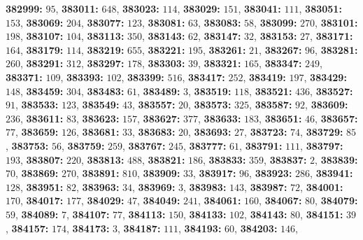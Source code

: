 \textsf{\bfseries 382999:} $95$, \textsf{\bfseries 383011:} $648$, \textsf{\bfseries 383023:} $114$, \textsf{\bfseries 383029:} $151$, \textsf{\bfseries 383041:} $111$, \textsf{\bfseries 383051:} $153$, \textsf{\bfseries 383069:} $204$, \textsf{\bfseries 383077:} $123$, \textsf{\bfseries 383081:} $63$, \textsf{\bfseries 383083:} $58$, \textsf{\bfseries 383099:} $270$, \textsf{\bfseries 383101:} $198$, \textsf{\bfseries 383107:} $104$, \textsf{\bfseries 383113:} $350$, \textsf{\bfseries 383143:} $62$, \textsf{\bfseries 383147:} $32$, \textsf{\bfseries 383153:} $27$, \textsf{\bfseries 383171:} $164$, \textsf{\bfseries 383179:} $114$, \textsf{\bfseries 383219:} $655$, \textsf{\bfseries 383221:} $195$, \textsf{\bfseries 383261:} $21$, \textsf{\bfseries 383267:} $96$, \textsf{\bfseries 383281:} $260$, \textsf{\bfseries 383291:} $312$, \textsf{\bfseries 383297:} $178$, \textsf{\bfseries 383303:} $39$, \textsf{\bfseries 383321:} $165$, \textsf{\bfseries 383347:} $249$, \textsf{\bfseries 383371:} $109$, \textsf{\bfseries 383393:} $102$, \textsf{\bfseries 383399:} $516$, \textsf{\bfseries 383417:} $252$, \textsf{\bfseries 383419:} $197$, \textsf{\bfseries 383429:} $148$, \textsf{\bfseries 383459:} $304$, \textsf{\bfseries 383483:} $61$, \textsf{\bfseries 383489:} $3$, \textsf{\bfseries 383519:} $118$, \textsf{\bfseries 383521:} $436$, \textsf{\bfseries 383527:} $91$, \textsf{\bfseries 383533:} $123$, \textsf{\bfseries 383549:} $43$, \textsf{\bfseries 383557:} $20$, \textsf{\bfseries 383573:} $325$, \textsf{\bfseries 383587:} $92$, \textsf{\bfseries 383609:} $236$, \textsf{\bfseries 383611:} $83$, \textsf{\bfseries 383623:} $157$, \textsf{\bfseries 383627:} $377$, \textsf{\bfseries 383633:} $183$, \textsf{\bfseries 383651:} $46$, \textsf{\bfseries 383657:} $77$, \textsf{\bfseries 383659:} $126$, \textsf{\bfseries 383681:} $33$, \textsf{\bfseries 383683:} $20$, \textsf{\bfseries 383693:} $27$, \textsf{\bfseries 383723:} $74$, \textsf{\bfseries 383729:} $85$, \textsf{\bfseries 383753:} $56$, \textsf{\bfseries 383759:} $259$, \textsf{\bfseries 383767:} $245$, \textsf{\bfseries 383777:} $61$, \textsf{\bfseries 383791:} $111$, \textsf{\bfseries 383797:} $193$, \textsf{\bfseries 383807:} $220$, \textsf{\bfseries 383813:} $488$, \textsf{\bfseries 383821:} $186$, \textsf{\bfseries 383833:} $359$, \textsf{\bfseries 383837:} $2$, \textsf{\bfseries 383839:} $70$, \textsf{\bfseries 383869:} $270$, \textsf{\bfseries 383891:} $810$, \textsf{\bfseries 383909:} $33$, \textsf{\bfseries 383917:} $96$, \textsf{\bfseries 383923:} $286$, \textsf{\bfseries 383941:} $128$, \textsf{\bfseries 383951:} $82$, \textsf{\bfseries 383963:} $34$, \textsf{\bfseries 383969:} $3$, \textsf{\bfseries 383983:} $143$, \textsf{\bfseries 383987:} $72$, \textsf{\bfseries 384001:} $170$, \textsf{\bfseries 384017:} $177$, \textsf{\bfseries 384029:} $47$, \textsf{\bfseries 384049:} $241$, \textsf{\bfseries 384061:} $160$, \textsf{\bfseries 384067:} $80$, \textsf{\bfseries 384079:} $59$, \textsf{\bfseries 384089:} $7$, \textsf{\bfseries 384107:} $77$, \textsf{\bfseries 384113:} $150$, \textsf{\bfseries 384133:} $102$, \textsf{\bfseries 384143:} $80$, \textsf{\bfseries 384151:} $39$, \textsf{\bfseries 384157:} $174$, \textsf{\bfseries 384173:} $3$, \textsf{\bfseries 384187:} $111$, \textsf{\bfseries 384193:} $60$, \textsf{\bfseries 384203:} $146$, 
